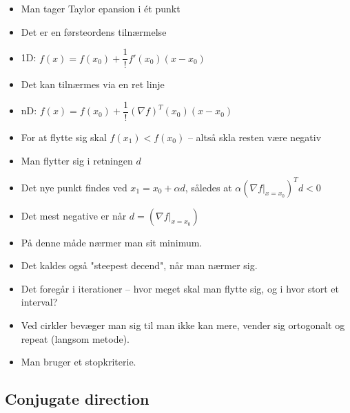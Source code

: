 \documentclass[danish, 10pt]{Memoir}
\begin{document}
\begin{itemize}
	\item Man tager Taylor epansion i ét punkt
	\item Det er en førsteordens tilnærmelse
	\item 1D: $f(x) = f(x_0) + \dfrac{1}{!} f'(x_0)(x-x_0)$
	\item Det kan tilnærmes via en ret linje
	\item nD: $f(x) = f(x_0) + \dfrac{1}{!} (\nabla f)^T(x_0)(x-x_0)$

	\item For at flytte sig skal $f(x_1) < f(x_0)$ -- altså skla resten være negativ
	\item Man flytter sig i retningen $d$
	\item Det nye punkt findes ved $x_1 = x_0 + \alpha d$, således at $\alpha ( \nabla f |_{x=x_0})^T d < 0$

	\item Det mest negative er når $d = (\nabla f |_{x=x_0})$
	\item På denne måde nærmer man sit minimum.
	\item Det kaldes også "steepest decend", når man nærmer sig.
	\item Det foregår i iterationer -- hvor meget skal man flytte sig, og i hvor stort et interval?
	\item Ved cirkler bevæger man sig til man ikke kan mere, vender sig ortogonalt og repeat (langsom metode).
	\item Man bruger et stopkriterie.
\end{itemize}


\subsection{Conjugate direction} %
\label{sub:conjugate_direction}
\end{document}

